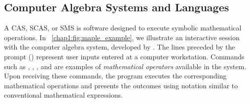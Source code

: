 \subsection{Computer Algebra Systems and Languages}

A \ac{CAS}, \ac{SCAS}, or \ac{SMS} is software designed to execute symbolic mathematical operations. In \figurename~\ref{chap1:fig:maple_example}, we illustrate an interactive session with the \Maple{} computer algebra system, developed by \MapleSoft{}. The lines preceded by the prompt (\code{>}) represent user inputs entered at a computer workstation. Commands such as , , , and  are examples of \emph{mathematical operators} available in the \Maple{} system. Upon receiving these commands, the program executes the corresponding mathematical operations and presents the outcomes using notation similar to conventional mathematical expressions.

